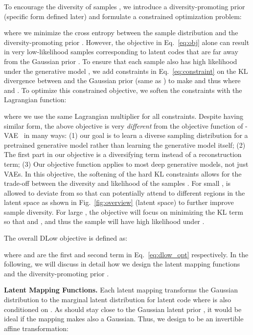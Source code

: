\documentclass[runningheads]{llncs}
\begin{document}
	
	To encourage the diversity of samples , we introduce a diversity-promoting prior  (specific form defined later) and formulate a constrained optimization problem:
	\vspace{-2mm}
	
	where we minimize the cross entropy between the sample distribution  and the diversity-promoting prior .
	However, the objective in Eq.~\eqref{eq:obj} alone can result in very low-likelihood samples  corresponding to latent codes  that are far away from the Gaussian prior .
	To ensure that each sample  also has high likelihood under the generative model ,  we add constraints in Eq.~\eqref{eq:constraint} on the KL divergence between  and the Gaussian prior  (same as ) to make  and thus  where  and . To optimize this constrained objective, we soften the constraints with the Lagrangian function:
	\vspace{-2mm}
	
	where we use the same Lagrangian multiplier  for all constraints. Despite having similar form, the above objective is very \emph{different} from the objective function of -VAE~\cite{higgins2017beta} in many ways: (1) our goal is to learn a diverse sampling distribution  for a pretrained generative model rather than learning the generative model itself; (2) The first part in our objective is a diversifying term instead of a reconstruction term; (3) Our objective function applies to most deep generative models, not just VAEs. In this objective, the softening of the hard KL constraints allows for the trade-off between the diversity and likelihood of the samples . For small ,  is allowed to deviate from  so that  can potentially attend to different regions in the latent space as shown in Fig.~\ref{fig:overview} (latent space) to further improve sample diversity. For large , the objective will focus on minimizing the KL term so that  and , and thus the sample  will have high likelihood under . 
	
	
	The overall DLow objective is defined as:
	
	where  and  are the first and second term in Eq.~\eqref{eq:dlow_opt} respectively.
	In the following, we will discuss in detail how we design the latent mapping functions  and the diversity-promoting prior .
	
	
	
	\vspace{2mm}
	\noindent\textbf{Latent Mapping Functions.}
	Each latent mapping  transforms the Gaussian distribution  to the marginal latent distribution  for latent code  where  is also conditioned on . As  should stay close to the Gaussian latent prior , it would be ideal if the mapping  makes  also a Gaussian. Thus, we design  to be an invertible affine transformation:
	
\end{document}
